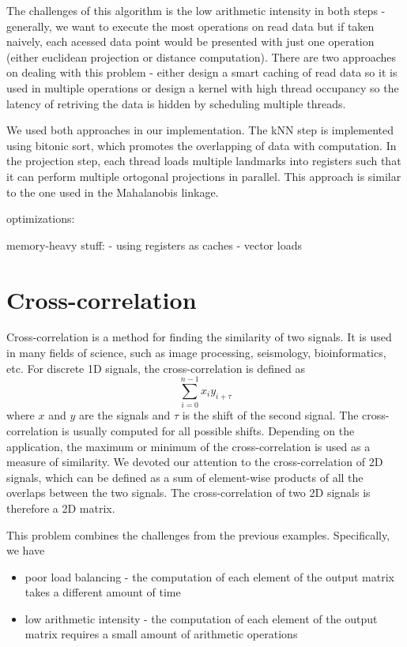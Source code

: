 The challenges of this algorithm is the low arithmetic intensity in both steps - generally, we want to execute the most operations on read data but if taken naively, each acessed data point would be presented with just one operation (either euclidean projection or distance computation).
There are two approaches on dealing with this problem - either design a smart caching of read data so it is used in multiple operations or design a kernel with high thread occupancy so the latency of retriving the data is hidden by scheduling multiple threads.

We used both approaches in our implementation. The kNN step is implemented using bitonic sort, which promotes the overlapping of data with computation. In the projection step, each thread loads multiple landmarks into registers such that it can perform multiple ortogonal projections in parallel. This approach is similar to the one used in the Mahalanobis linkage.

optimizations:

memory-heavy stuff:
- using registers as caches
- vector loads

\section{Cross-correlation}

Cross-correlation is a method for finding the similarity of two signals. It is used in many fields of science, such as image processing, seismology, bioinformatics, etc. For discrete 1D signals, the cross-correlation is defined as
$$ \sum_{i=0}^{n-1} x_i y_{i + \tau} $$
where $x$ and $y$ are the signals and $\tau$ is the shift of the second signal. The cross-correlation is usually computed for all possible shifts. Depending on the application, the maximum or minimum of the cross-correlation is used as a measure of similarity.
We devoted our attention to the cross-correlation of 2D signals, which can be defined as a sum of element-wise products of all the overlaps between the two signals. The cross-correlation of two 2D signals is therefore a 2D matrix.

This problem combines the challenges from the previous examples. Specifically, we have
\begin{itemize}
    \item poor load balancing - the computation of each element of the output matrix takes a different amount of time
    \item low arithmetic intensity - the computation of each element of the output matrix requires a small amount of arithmetic operations
\end{itemize}

